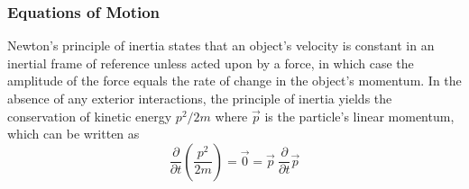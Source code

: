 \subsubsection{Equations of Motion}

Newton's principle of inertia states that an object's velocity is constant in an inertial frame of reference unless acted upon by a force, in which case the amplitude of the force equals the rate of change in the object's momentum. In the absence of any exterior interactions, the principle of inertia yields the conservation of kinetic energy $p^2 / 2m$ where $\vec{p}$ is the particle's linear momentum, which can be written as \\

\begin{equation}
\label{eq:kinetic}
\frac{\partial}{\partial t} \left( \frac{p^2}{2m} \right) = \vec{0} = \vec{p} ~ \frac{\partial}{\partial t} \vec{p}
\end{equation} \\

